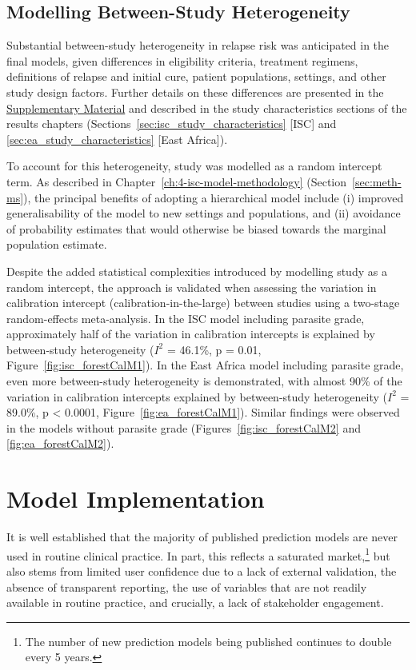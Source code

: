 \subsection{Modelling Between-Study Heterogeneity\label{sec:modelling-heterogeneity}}

Substantial between-study heterogeneity in relapse risk was anticipated in the final models, given differences in eligibility criteria, treatment regimens, definitions of relapse and initial cure, patient populations, settings, and other study design factors. Further details on these differences are presented in the \href{https://github.com/jpwil/dphil}{Supplementary Material} and described in the study characteristics sections of the results chapters (Sections~\ref{sec:isc_study_characteristics} [ISC] and \ref{sec:ea_study_characteristics} [East Africa]).

To account for this heterogeneity, study was modelled as a random intercept term. As described in Chapter~\ref{ch:4-isc-model-methodology} (Section~\ref{sec:meth-ms}), the principal benefits of adopting a hierarchical model include (i) improved generalisability of the model to new settings and populations, and (ii) avoidance of probability estimates that would otherwise be biased towards the marginal population estimate\cite{debray2023,wynants2020,steyerberg2019}.

Despite the added statistical complexities introduced by modelling study as a random intercept, the approach is validated when assessing the variation in calibration intercept (calibration-in-the-large) between studies using a two-stage random-effects meta-analysis. In the ISC model including parasite grade, approximately half of the variation in calibration intercepts is explained by between-study heterogeneity ($I^2$ = 46.1\%, p = 0.01, Figure~\ref{fig:isc_forestCalM1}). In the East Africa model including parasite grade, even more between-study heterogeneity is demonstrated, with almost 90\% of the variation in calibration intercepts explained by between-study heterogeneity ($I^2$ = 89.0\%, p < 0.0001, Figure~\ref{fig:ea_forestCalM1}). Similar findings were observed in the models without parasite grade (Figures~\ref{fig:isc_forestCalM2} and \ref{fig:ea_forestCalM2}).

\section{Model Implementation}

It is well established that the majority of published prediction models are never used in routine clinical practice\cite{markowetz2024}. In part, this reflects a saturated market,\footnote{The number of new prediction models being published continues to double every 5 years\cite{arshi2025}.} but also stems from limited user confidence due to a lack of external validation, the absence of transparent reporting, the use of variables that are not readily available in routine practice, and crucially, a lack of stakeholder engagement\cite{markowetz2024,moons2015}.

